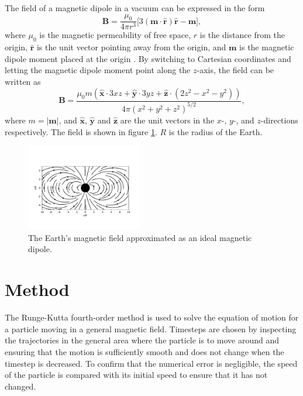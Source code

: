 \documentclass[5p,sort&compress]{elsarticle}
\begin{document}
The field of a magnetic dipole in a vacuum can be expressed in the form
\begin{equation}
\bm{B} = \frac{\mu_0}{4\pi r^3} \big[3(\bm{m}\cdot\bm{\hat{r}})\bm{\hat{r}} - \bm{m} \big],
\label{eq:mag_dipole}
\end{equation}
where $\mu_0$ is the magnetic permeability of free space, $r$ is the distance from the origin, $\bm{\hat{r}}$ is the unit vector pointing away from the origin, and $\bm{m}$ is the magnetic dipole moment placed at the origin \cite[p.~255]{Griffiths2017}. By switching to Cartesian coordinates and letting the magnetic dipole moment point along the $z$-axis, the field can be written as
\begin{equation}
    \bm{B} = \frac{\mu_0 m (\bm{\hat{x}}\cdot3xz + \bm{\hat{y}}\cdot3yz + \bm{\hat{z}}\cdot(2z^2 -x^2 - y^2))}{4 \pi (x^2 + y^2 + z^2)^{5/2}},
\end{equation}
where $m = \left|\bm{m}\right|$, and $\bm{\hat{x}}$, $\bm{\hat{y}}$ and $\bm{\hat{z}}$ are the unit vectors in the $x$-, $y$-, and $z$-directions respectively. The field is shown in figure \ref{fig:field}. $R$ is the radius of the Earth.

\begin{figure}[h]
    \centering
    \includegraphics[width=0.45\textwidth]{field.pdf}
    \caption{The Earth's magnetic field approximated as an ideal magnetic dipole.}
    \label{fig:field}
\end{figure}

\section{Method}
The Runge-Kutta fourth-order method is used to solve the equation of motion for a particle moving in a general magnetic field. Timesteps are chosen by inspecting the trajectories in the general area where the particle is to move around and ensuring that the motion is sufficiently smooth and does not change when the timestep is decreased. To confirm that the numerical error is negligible, the speed of the particle is compared with its initial speed to ensure that it has not changed.
\end{document}
